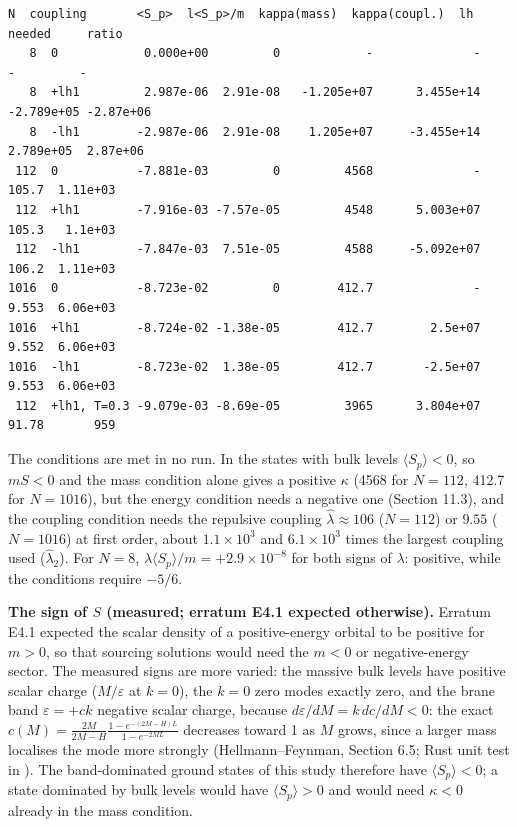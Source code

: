 \documentclass[11pt]{article}
\begin{document}
\begin{Verbatim}[fontsize=\small]
   N  coupling       <S_p>  l<S_p>/m  kappa(mass)  kappa(coupl.)  lh needed     ratio
   8  0            0.000e+00         0            -              -          -         -
   8  +lh1         2.987e-06  2.91e-08   -1.205e+07      3.455e+14 -2.789e+05 -2.87e+06
   8  -lh1        -2.987e-06  2.91e-08    1.205e+07     -3.455e+14  2.789e+05  2.87e+06
 112  0           -7.881e-03         0         4568              -      105.7  1.11e+03
 112  +lh1        -7.916e-03 -7.57e-05         4548      5.003e+07      105.3   1.1e+03
 112  -lh1        -7.847e-03  7.51e-05         4588     -5.092e+07      106.2  1.11e+03
1016  0           -8.723e-02         0        412.7              -      9.553  6.06e+03
1016  +lh1        -8.724e-02 -1.38e-05        412.7        2.5e+07      9.552  6.06e+03
1016  -lh1        -8.723e-02  1.38e-05        412.7       -2.5e+07      9.553  6.06e+03
 112  +lh1, T=0.3 -9.079e-03 -8.69e-05         3965      3.804e+07      91.78       959
\end{Verbatim}

The conditions are met in no run. In the states with bulk levels $\langle S_p\rangle<0$, so $mS<0$ and the mass condition alone gives a positive $\kappa$ (4568 for $N=112$, 412.7 for $N=1016$), but the energy condition needs a negative one (Section 11.3), and the coupling condition needs the repulsive coupling $\hat\lambda\approx106$ ($N=112$) or $9.55$ ($N=1016$) at first order, about $1.1\times10^3$ and $6.1\times10^3$ times the largest coupling used ($\hat\lambda_2$). For $N=8$, $\lambda\langle S_p\rangle/m=+2.9\times10^{-8}$ for both signs of $\lambda$: positive, while the conditions require $-5/6$.

\textbf{The sign of $S$ (measured; erratum E4.1 expected otherwise).} Erratum E4.1 expected the scalar density of a positive-energy orbital to be positive for $m>0$, so that sourcing solutions would need the $m<0$ or negative-energy sector. The measured signs are more varied: the massive bulk levels have positive scalar charge ($M/\varepsilon$ at $k=0$), the $k=0$ zero modes exactly zero, and the brane band $\varepsilon=+ck$ negative scalar charge, because $d\varepsilon/dM=k\,dc/dM<0$: the exact $c(M)=\frac{2M}{2M-H}\frac{1-e^{-(2M-H)L}}{1-e^{-2ML}}$ decreases toward 1 as $M$ grows, since a larger mass localises the mode more strongly (Hellmann--Feynman, Section 6.5; Rust unit test in \texttt{}). The band-dominated ground states of this study therefore have $\langle S_p\rangle<0$; a state dominated by bulk levels would have $\langle S_p\rangle>0$ and would need $\kappa<0$ already in the mass condition.
\end{document}
